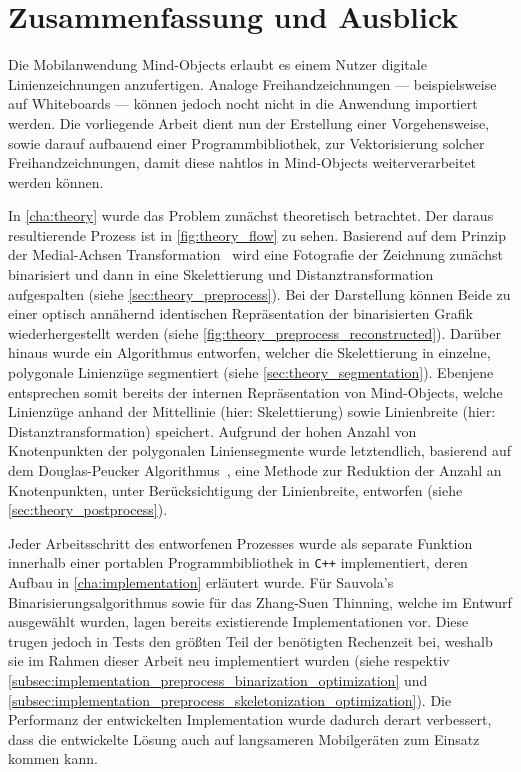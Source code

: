\chapter{Zusammenfassung und Ausblick}

Die Mobilanwendung Mind-Objects erlaubt es einem Nutzer digitale Linienzeichnungen anzufertigen.
Analoge Freihandzeichnungen --- beispielsweise auf Whiteboards --- können jedoch nocht nicht in die Anwendung importiert werden.
Die vorliegende Arbeit dient nun der Erstellung einer Vorgehensweise, sowie darauf aufbauend einer Programmbibliothek, zur Vektorisierung solcher Freihandzeichnungen, damit diese nahtlos in Mind-Objects weiterverarbeitet werden können.

In \autoref{cha:theory} wurde das Problem zunächst theoretisch betrachtet.
Der daraus resultierende Prozess ist in \autoref{fig:theory_flow} zu sehen.
Basierend auf dem Prinzip der Medial-Achsen Transformation~\cite{Blum:1967:ATF} wird eine Fotografie der Zeichnung zunächst binarisiert und dann in eine Skelettierung und Distanztransformation aufgespalten (siehe \autoref{sec:theory_preprocess}).
Bei der Darstellung können Beide zu einer optisch annähernd identischen Repräsentation der binarisierten Grafik wiederhergestellt werden (siehe \autoref{fig:theory_preprocess_reconstructed}).
Darüber hinaus wurde ein Algorithmus entworfen, welcher die Skelettierung in einzelne, polygonale Linienzüge segmentiert (siehe \autoref{sec:theory_segmentation}).
Ebenjene entsprechen somit bereits der internen Repräsentation von Mind-Objects, welche Linienzüge anhand der Mittellinie (hier: Skelettierung) sowie Linienbreite (hier: Distanztransformation) speichert.
Aufgrund der hohen Anzahl von Knotenpunkten der polygonalen Liniensegmente wurde letztendlich, basierend auf dem Douglas-Peucker Algorithmus~\cite{doi:10.3138/FM57-6770-U75U-7727}, eine Methode zur Reduktion der Anzahl an Knotenpunkten, unter Berücksichtigung der Linienbreite, entworfen (siehe \autoref{sec:theory_postprocess}).

Jeder Arbeitsschritt des entworfenen Prozesses wurde als separate Funktion innerhalb einer portablen Programmbibliothek in \texttt{C++} implementiert, deren Aufbau in \autoref{cha:implementation} erläutert wurde.
Für Sauvola's Binarisierungsalgorithmus sowie für das Zhang-Suen Thinning, welche im Entwurf ausgewählt wurden, lagen bereits existierende Implementationen vor.
Diese trugen jedoch in Tests den größten Teil der benötigten Rechenzeit bei, weshalb sie im Rahmen dieser Arbeit neu implementiert wurden (siehe respektiv \autoref{subsec:implementation_preprocess_binarization_optimization} und \autoref{subsec:implementation_preprocess_skeletonization_optimization}).
Die Performanz der entwickelten Implementation wurde dadurch derart verbessert, dass die entwickelte Lösung auch auf langsameren Mobilgeräten zum Einsatz kommen kann.

